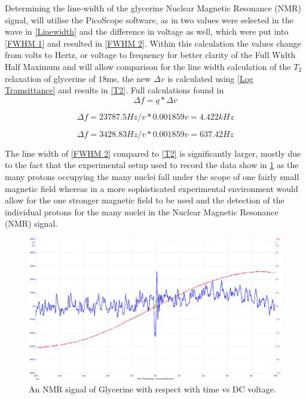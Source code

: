\documentclass[12pt]{article}
\begin{document}
Determining the line-width of the glycerine Nuclear Magnetic Resonance (NMR) signal, will utilise the PicoScope software, as in \cite{Exp.A-Lab_book} two values were selected in the wave in \cref{Linewidth} and the difference in voltage as well, which were put into \cref{FWHM 1} and resulted in \cref{FWHM 2}. Within this calculation the values change from volts to Hertz, or voltage to frequency for better clarity of the Full Width Half Maximum and will allow comparison for the line width calculation of the $T_2$ relaxation of glycerine of 18ms, the new $\Delta v$ is calculated using \cref{Log Tramsittance} and results in \cref{T2}. Full calculations found in \cite{Exp.A-Lab_book}\\

\begin{equation}
\Delta f = q * \Delta v
\label{FWHM 1}
\end{equation}

\begin{equation}
\Delta f = 23787.5 Hz/v * 0.001859v = 4.422 kHz
\label{FWHM 2}
\end{equation}

\begin{equation}
\Delta f = 3428.83 Hz/v * 0.001859v = 637.42 Hz
\label{T2}
\end{equation}

The line width of \cref{FWHM 2} compared to \cref{T2} is significantly larger, mostly due to the fact that the experimental setup used to record the data show in \cref{Part 1 1A} as the many protons occupying the many nuclei fall under the scope of one fairly small magnetic field whereas in a more sophisticated experimental environment would allow for the one stronger magnetic field to be used and the detection of the individual protons for the many nuclei in the Nuclear Magnetic Resonance (NMR) signal. \\

\begin{figure}[H]
\centering
\includegraphics[scale=0.45]{Images/Report/Part A/1A.png}
\caption{An NMR signal of Glycerine with respect with time vs DC voltage.}
\label{Part 1 1A}
\end{figure}
\end{document}
